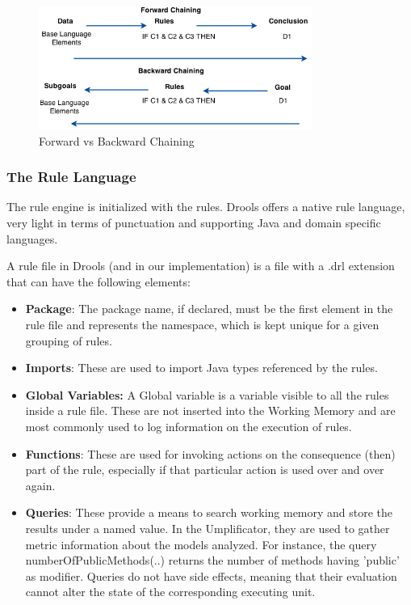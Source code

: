 \begin{figure}[h]
\centering
\includegraphics[width=0.80\textwidth]{Figures/ForwardBackwardChaining.png}
\caption{Forward vs Backward Chaining}
\label{fig:backwardForward}
\end{figure}

\subsubsection{The Rule Language}
The rule engine is initialized with the rules. Drools offers a native rule language, very light in terms of punctuation and supporting Java and domain specific languages. 

A rule file in Drools (and in our implementation) is a file with a .drl extension that can have the following elements:

\begin{itemize}
\item \textbf{Package}: The package name, if declared, must be the first element in the rule file and represents the namespace, which is kept unique for a given grouping of rules.
\item \textbf{Imports}: These are used to import Java types referenced by the rules.
\item \textbf{Global Variables:} A Global variable is a variable visible to all the rules inside a rule file. These are not inserted into the Working Memory and are most commonly used to log information on the execution of rules.
\item \textbf{Functions}: These are used for invoking actions on the consequence (then) part of the rule, especially if that particular action is used over and over again. 
\item \textbf{Queries}: These provide a means to search working memory and store the results under a named value. In the Umplificator, they are used to gather metric information about the models analyzed. For instance, the query  numberOfPublicMethods(..) returns the number of methods having 'public' as modifier. Queries do not have side effects, meaning that their evaluation cannot alter the state of the corresponding executing unit. 
\end{itemize}

